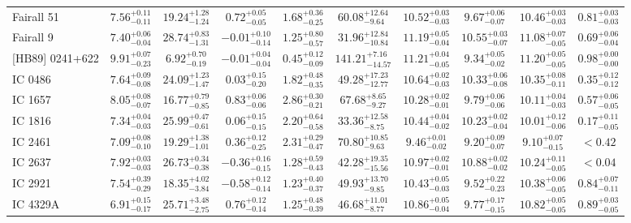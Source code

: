 \documentclass[onecolumn]{mn2e}
\begin{document}
\begin{landscape}
{\begin{center}
\begin{longtable}{lccccccccc}
Fairall 51 & $7.56_{-0.11}^{+0.11}$ & $19.24_{-1.24}^{+1.28}$ & $0.72_{-0.05}^{+0.05}$ & $1.68_{-0.25}^{+0.36}$ &$60.08_{-9.64}^{+12.64}$ & $10.52_{-0.03}^{+0.03}$ & $9.67_{-0.07}^{+0.06}$ & $10.46_{-0.03}^{+0.03}$ & $0.81_{-0.03}^{+0.03}$ \\
Fairall 9 & $7.40_{-0.04}^{+0.06}$ & $28.74_{-1.31}^{+0.83}$ & $-0.01_{-0.14}^{+0.10}$ & $1.25_{-0.57}^{+0.80}$ &$31.96_{-10.84}^{+12.84}$ & $11.19_{-0.04}^{+0.05}$ & $10.55_{-0.07}^{+0.03}$ & $11.08_{-0.05}^{+0.07}$ & $0.69_{-0.04}^{+0.06}$ \\
{[HB89]} 0241+622 & $9.91_{-0.23}^{+0.07}$ & $6.92_{-0.19}^{+0.70}$ & $-0.01_{-0.04}^{+0.04}$ & $0.45_{-0.09}^{+0.12}$ &$141.21_{-14.57}^{+7.16}$ & $11.21_{-0.05}^{+0.04}$ & $9.34_{-0.02}^{+0.05}$ & $11.20_{-0.05}^{+0.05}$ & $0.98_{-0.00}^{+0.00}$ \\
IC 0486 & $7.64_{-0.08}^{+0.09}$ & $24.09_{-1.47}^{+1.23}$ & $0.03_{-0.20}^{+0.15}$ & $1.82_{-0.35}^{+0.48}$ &$49.28_{-12.77}^{+17.23}$ & $10.64_{-0.03}^{+0.02}$ & $10.33_{-0.08}^{+0.06}$ & $10.35_{-0.11}^{+0.08}$ & $0.35_{-0.12}^{+0.12}$ \\
IC 1657 & $8.05_{-0.07}^{+0.08}$ & $16.77_{-0.85}^{+0.79}$ & $0.83_{-0.06}^{+0.06}$ & $2.86_{-0.21}^{+0.30}$ &$67.68_{-9.27}^{+8.65}$ & $10.28_{-0.01}^{+0.02}$ & $9.79_{-0.06}^{+0.06}$ & $10.11_{-0.03}^{+0.04}$ & $0.57_{-0.05}^{+0.06}$ \\
IC 1816 & $7.34_{-0.03}^{+0.04}$ & $25.99_{-0.61}^{+0.47}$ & $0.06_{-0.15}^{+0.15}$ & $2.20_{-0.58}^{+0.64}$ &$33.36_{-8.75}^{+12.58}$ & $10.44_{-0.02}^{+0.04}$ & $10.23_{-0.04}^{+0.02}$ & $10.01_{-0.06}^{+0.12}$ & $0.17_{-0.05}^{+0.11}$ \\
IC 2461 & $7.09_{-0.10}^{+0.08}$ & $19.29_{-1.01}^{+1.38}$ & $0.36_{-0.25}^{+0.12}$ & $2.31_{-0.47}^{+0.29}$ &$70.80_{-9.63}^{+10.85}$ & $9.46_{-0.02}^{+0.01}$ & $9.20_{-0.07}^{+0.09}$ & $9.10_{-0.15}^{+0.07}$ & $<0.42$ \\
IC 2637 & $7.92_{-0.03}^{+0.03}$ & $26.73_{-0.38}^{+0.34}$ & $-0.36_{-0.15}^{+0.16}$ & $1.28_{-0.43}^{+0.59}$ &$42.28_{-15.56}^{+19.35}$ & $10.97_{-0.01}^{+0.02}$ & $10.88_{-0.02}^{+0.02}$ & $10.24_{-0.05}^{+0.11}$ & $<0.04$ \\
IC 2921 & $7.54_{-0.29}^{+0.39}$ & $18.35_{-3.84}^{+4.02}$ & $-0.58_{-0.14}^{+0.12}$ & $1.23_{-0.37}^{+0.40}$ &$49.93_{-9.85}^{+13.70}$ & $10.43_{-0.03}^{+0.05}$ & $9.52_{-0.23}^{+0.22}$ & $10.38_{-0.05}^{+0.06}$ & $0.84_{-0.11}^{+0.07}$ \\
IC 4329A & $6.91_{-0.17}^{+0.15}$ & $25.71_{-2.75}^{+3.48}$ & $0.76_{-0.14}^{+0.12}$ & $1.25_{-0.39}^{+0.48}$ &$46.68_{-8.77}^{+11.01}$ & $10.86_{-0.04}^{+0.05}$ & $9.77_{-0.15}^{+0.17}$ & $10.82_{-0.05}^{+0.05}$ & $0.89_{-0.05}^{+0.03}$ \\

\end{longtable}
\end{center}}
\end{landscape}
\end{document}
